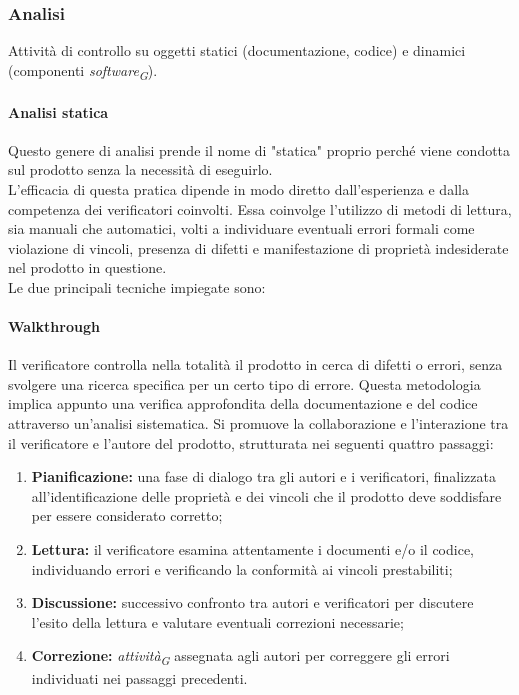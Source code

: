 \subsubsection{Analisi}
Attività di controllo su oggetti statici (documentazione, codice) e dinamici (componenti \textit{software}\textsubscript{\textit{G}}).

\paragraph{Analisi statica}
Questo genere di analisi prende il nome di "statica" proprio perché viene condotta sul prodotto senza la necessità di eseguirlo. \\ L'efficacia di questa pratica dipende in modo diretto dall'esperienza e dalla competenza dei verificatori coinvolti. Essa coinvolge l'utilizzo di metodi di lettura, sia manuali che automatici, volti a individuare eventuali errori formali come violazione di vincoli, presenza di difetti e manifestazione di proprietà indesiderate nel prodotto in questione. \\
Le due principali tecniche impiegate sono:

\paragraph{Walkthrough}
Il verificatore controlla nella totalità il prodotto in cerca di difetti o errori, senza svolgere una ricerca specifica per un certo tipo di errore. Questa metodologia implica appunto una verifica approfondita della documentazione e del codice attraverso un'analisi sistematica. Si promuove la collaborazione e l'interazione tra il verificatore e l'autore del prodotto, strutturata nei seguenti quattro passaggi:

\begin{enumerate}
    \item \textbf{Pianificazione:} 
        una fase di dialogo tra gli autori e i verificatori, finalizzata all'identificazione delle proprietà e dei vincoli che il prodotto deve soddisfare per essere considerato corretto; 

    \item \textbf{Lettura:} 
        il verificatore esamina attentamente i documenti e/o il codice, individuando errori e verificando la conformità ai vincoli prestabiliti; 

    \item \textbf{Discussione:} 
        successivo confronto tra autori e verificatori per discutere l'esito della lettura e valutare eventuali correzioni necessarie; 

    \item \textbf{Correzione:} 
        \textit{attività}\textsubscript{\textit{G}} assegnata agli autori per correggere gli errori individuati nei passaggi precedenti.
\end{enumerate}

